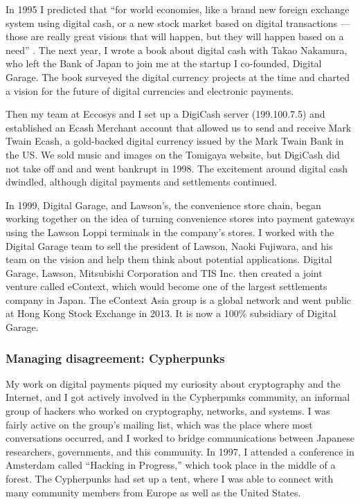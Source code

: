 In 1995 I predicted that ``for world economies, like a brand new foreign exchange system using digital cash, or a new stock market based on digital transactions --- those are really great visions that will happen, but they will happen based on a need'' \cite{EccosysI53:online}. The next year, I wrote a book about digital cash \cite{digitalcash} with Takao Nakamura, who left the Bank of Japan to join me at the startup I co-founded, Digital Garage. The book surveyed the digital currency projects at the time and charted a vision for the future of digital currencies and electronic payments.

Then my team at Eccosys and I set up a DigiCash server (199.100.7.5) and established an Ecash Merchant account that allowed us to send and receive Mark Twain Ecash, a gold-backed digital currency issued by the Mark Twain Bank in the US. We sold music and images on the Tomigaya website, but DigiCash did not take off and and went bankrupt in 1998. The excitement around digital cash dwindled, although digital payments and settlements continued.

In 1999, Digital Garage, and Lawson's, the convenience store chain, began working together on the idea of turning convenience stores into payment gateways using the Lawson Loppi terminals in the company's stores. I worked with the Digital Garage team to sell the president of Lawson, Naoki Fujiwara, and his team on the vision and help them think about potential applications. Digital Garage, Lawson, Mitsubishi Corporation and TIS Inc. then created a joint venture called eContext, which would become one of the largest settlements company in Japan. The eContext Asia group is a global network and went public at Hong Kong Stock Exchange in 2013. It is now a 100\% subsidiary of Digital Garage.

\subsubsection{Managing disagreement: Cypherpunks}

My work on digital payments piqued my curiosity about cryptography and the Internet, and I got actively involved in the Cypherpunks community, an informal group of hackers who worked on cryptography, networks, and systems. I was fairly active on the group's mailing list, which was the place where most conversations occurred, and I worked to bridge communications between Japanese researchers, governments, and this community. In 1997, I attended a conference in Amsterdam called ``Hacking in Progress,'' which took place in the middle of a forest. The Cypherpunks had set up a tent, where I was able to connect with many community members from Europe as well as the United States.

